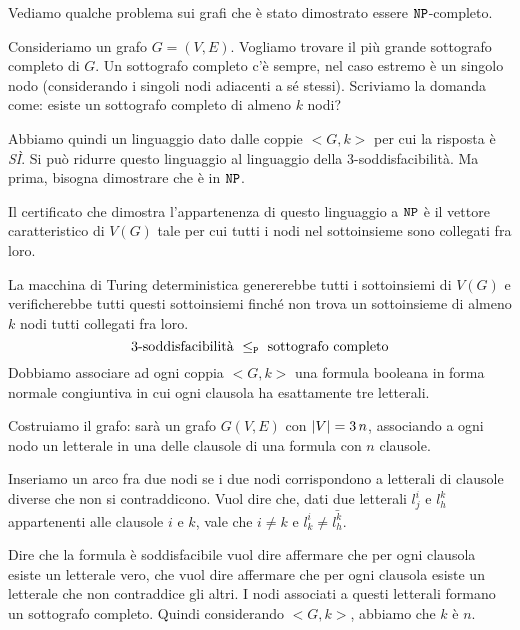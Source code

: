 Vediamo qualche problema sui grafi che \`e stato dimostrato essere $\texttt{NP}$-completo.

Consideriamo un grafo $G = (V,E)$. Vogliamo trovare il pi\`u grande sottografo completo di $G$. Un sottografo completo c'\`e sempre, nel caso estremo \`e un singolo nodo (considerando i singoli nodi adiacenti a s\'e stessi). Scriviamo la domanda come: esiste un sottografo completo di almeno $k$ nodi?

Abbiamo quindi un linguaggio dato dalle coppie $<G, k>$ per cui la risposta \`e \emph{S\`I}. Si pu\`o ridurre questo linguaggio al linguaggio della 3-soddisfacibilit\`a. Ma prima, bisogna dimostrare che \`e in $\texttt{NP}$.

Il certificato che dimostra l'appartenenza di questo linguaggio a $\texttt{NP}$ \`e il vettore caratteristico di $V(G)$ tale per cui tutti i nodi nel sottoinsieme sono collegati fra loro.

La macchina di Turing deterministica genererebbe tutti i sottoinsiemi di $V(G)$ e verificherebbe tutti questi sottoinsiemi finch\'e non trova un sottoinsieme di almeno $k$ nodi tutti collegati fra loro.
\[
\text{3-soddisfacibilit\`a } \le_{\texttt{P}} \text{ sottografo completo}
\]
Dobbiamo associare ad ogni coppia $<G, k>$ una formula booleana in forma normale congiuntiva in cui ogni clausola ha esattamente tre letterali.

Costruiamo il grafo: sar\`a un grafo $G(V,E)$ con $\left\lvert{V}\right\rvert = 3 \, n$, associando a ogni nodo un letterale in una delle clausole di una formula con $n$ clausole.

Inseriamo un arco fra due nodi se i due nodi corrispondono a letterali di clausole diverse che non si contraddicono. Vuol dire che, dati due letterali $l^{i}_{j}$ e $l^{k}_{h}$ appartenenti alle clausole $i$ e $k$, vale che $i \neq k$ e $l^i_k \neq \bar {l^k_h}$.

Dire che la formula \`e soddisfacibile vuol dire affermare che per ogni clausola esiste un letterale vero, che vuol dire affermare che per ogni clausola esiste un letterale che non contraddice gli altri. I nodi associati a questi letterali formano un sottografo completo. Quindi considerando $<G,k>$, abbiamo che $k$ \`e $n$.

